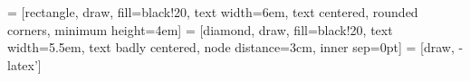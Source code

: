 % 
%

 = [rectangle, draw, fill=black!20, text width=6em, text centered, rounded corners, minimum height=4em]
 = [diamond, draw, fill=black!20, text width=5.5em, text badly centered, node distance=3cm, inner sep=0pt]
 = [draw, -latex']